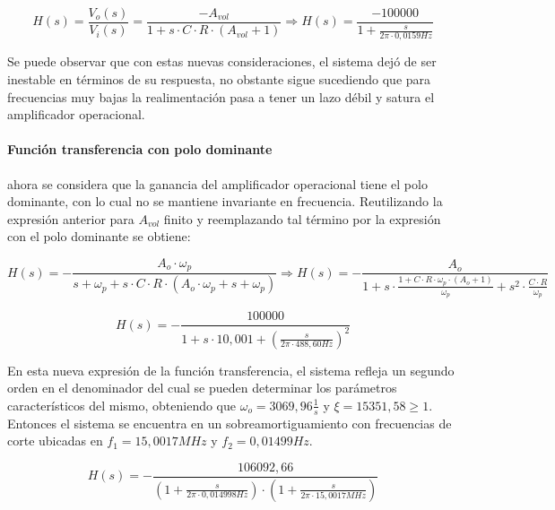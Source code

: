 \begin{equation}
	H(s) = \frac{V_o(s)}{V_i(s)} = \frac{-A_{vol}}{1 + s \cdot C \cdot R \cdot (A_{vol} + 1)}
	\Rightarrow
	H(s) = \frac{-100000}{1 + \frac{s}{2 \pi \cdot 0,0159Hz}}
	\label{eq:integrador_transfer_avol_finito}
\end{equation}

Se puede observar que con estas nuevas consideraciones, el sistema dej\'o de ser inestable en t\'erminos de su respuesta, no obstante sigue sucediendo que para frecuencias muy bajas la realimentaci\'on pasa a tener un lazo d\'ebil y satura el amplificador operacional.

\paragraph*{Funci\'on transferencia con polo dominante} ahora se considera que la ganancia del amplificador operacional tiene el polo dominante, con lo cual no se mantiene invariante en frecuencia. Reutilizando la expresi\'on anterior para $A_{vol}$ finito y reemplazando tal t\'ermino por la expresi\'on con el polo dominante se obtiene:

\begin{equation*}
	H(s) = - \frac{A_o \cdot \omega_p}{s + \omega_p + s \cdot C \cdot R \cdot (A_o \cdot \omega_p + s + \omega_p)}
	\Rightarrow
	H(s) = - \frac{A_o}{1 + s \cdot \frac{1 + C \cdot R \cdot \omega_p \cdot ( A_o + 1 )}{\omega_p} + s^{2} \cdot \frac{C \cdot R}{\omega_p}}
\end{equation*}

\begin{equation*}
	H(s) = - \frac{100000}{1 + s \cdot 10,001 + \left( \frac{s}{2 \pi \cdot 488,60Hz} \right)^{2}}
\end{equation*}

En esta nueva expresi\'on de la funci\'on transferencia, el sistema refleja un segundo orden en el denominador del cual se pueden determinar los par\'ametros caracter\'isticos del mismo, obteniendo que $\omega_o = 3069,96 \frac{1}{s}$ y $\xi = 15351,58 \geq 1$. Entonces el sistema se encuentra en un sobreamortiguamiento con frecuencias de corte ubicadas en $f_1 = 15,0017MHz$ y $f_2 = 0,01499Hz$.

\begin{equation}
	H(s) = - \frac{106092,66}{(1 + \frac{s}{2 \pi \cdot 0,014998Hz}) \cdot (1 + \frac{s}{2 \pi \cdot 15,0017MHz})}
	\label{eq:integrador_transfer_polo_dominante}
\end{equation}

